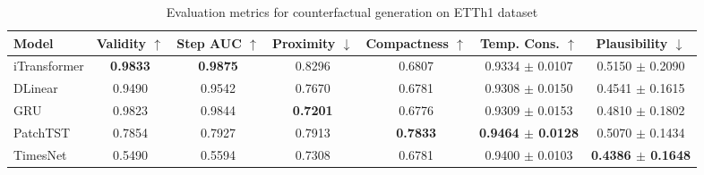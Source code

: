 \begin{table}[htbp]
\centering
\caption{Evaluation metrics for counterfactual generation on ETTh1 dataset}
\label{tab:cf_evaluation}
\begin{tabular}{l|cccccc}
\toprule
\textbf{Model} & \textbf{Validity} $\uparrow$ & \textbf{Step AUC} $\uparrow$ & \textbf{Proximity} $\downarrow$ & \textbf{Compactness} $\uparrow$ & \textbf{Temp. Cons.} $\uparrow$ & \textbf{Plausibility} $\downarrow$ \\
\midrule
iTransformer & \textbf{0.9833} & \textbf{0.9875} & 0.8296 & 0.6807 & 0.9334 $\pm$ 0.0107 & 0.5150 $\pm$ 0.2090 \\
DLinear & 0.9490 & 0.9542 & 0.7670 & 0.6781 & 0.9308 $\pm$ 0.0150 & 0.4541 $\pm$ 0.1615 \\
GRU & 0.9823 & 0.9844 & \textbf{0.7201} & 0.6776 & 0.9309 $\pm$ 0.0153 & 0.4810 $\pm$ 0.1802 \\
PatchTST & 0.7854 & 0.7927 & 0.7913 & \textbf{0.7833} & \textbf{0.9464 $\pm$ 0.0128} & 0.5070 $\pm$ 0.1434 \\
TimesNet & 0.5490 & 0.5594 & 0.7308 & 0.6781 & 0.9400 $\pm$ 0.0103 & \textbf{0.4386 $\pm$ 0.1648} \\
\bottomrule
\end{tabular}
\end{table}